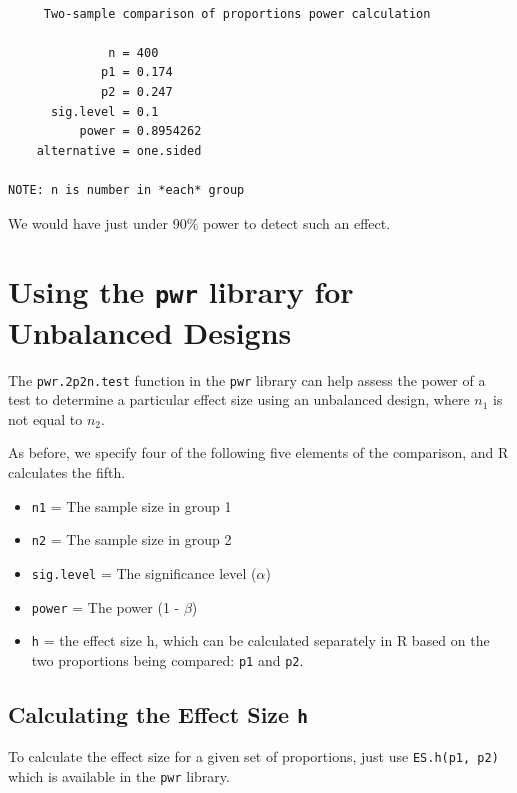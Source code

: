 \documentclass[
]{book}
\providecommand{\tightlist}{%
  \setlength{\itemsep}{0pt}\setlength{\parskip}{0pt}}
\begin{document}
\begin{verbatim}

     Two-sample comparison of proportions power calculation 

              n = 400
             p1 = 0.174
             p2 = 0.247
      sig.level = 0.1
          power = 0.8954262
    alternative = one.sided

NOTE: n is number in *each* group
\end{verbatim}

We would have just under 90\% power to detect such an effect.

\hypertarget{using-the-pwr-library-for-unbalanced-designs}{%
\section{\texorpdfstring{Using the \texttt{pwr} library for Unbalanced Designs}{Using the pwr library for Unbalanced Designs}}\label{using-the-pwr-library-for-unbalanced-designs}}

The \texttt{pwr.2p2n.test} function in the \texttt{pwr} library can help assess the power of a test to determine a particular effect size using an unbalanced design, where \(n_1\) is not equal to \(n_2\).

As before, we specify four of the following five elements of the comparison, and R calculates the fifth.

\begin{itemize}
\tightlist
\item
  \texttt{n1} = The sample size in group 1
\item
  \texttt{n2} = The sample size in group 2
\item
  \texttt{sig.level} = The significance level (\(\alpha\))
\item
  \texttt{power} = The power (1 - \(\beta\))
\item
  \texttt{h} = the effect size h, which can be calculated separately in R based on the two proportions being compared: \texttt{p1} and \texttt{p2}.
\end{itemize}

\hypertarget{calculating-the-effect-size-h}{%
\subsection{\texorpdfstring{Calculating the Effect Size \texttt{h}}{Calculating the Effect Size h}}\label{calculating-the-effect-size-h}}

To calculate the effect size for a given set of proportions, just use \texttt{ES.h(p1,\ p2)} which is available in the \texttt{pwr} library.
\end{document}
